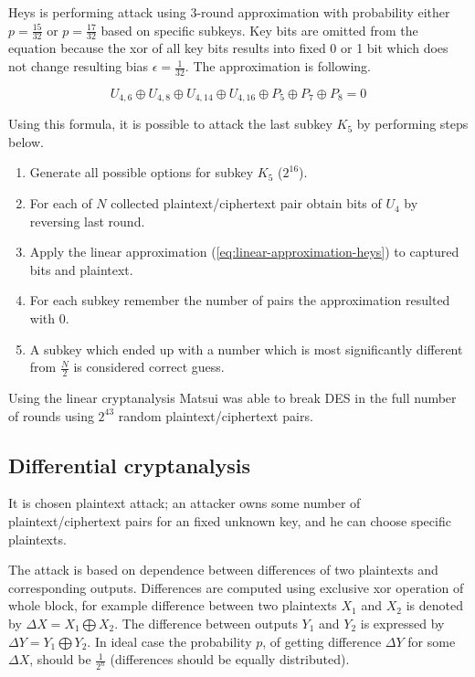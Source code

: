 \documentclass[
    digital,    %
    oneside,    %
    color,
    11pt,
    nocover,
    notable,
    nolof,
    nolot,
    final
]{fithesis3}
\renewcommand\_{\textunderscore\allowbreak}
\begin{document}
\begin{description}
	Heys is performing attack using 3-round approximation with probability either $p = \frac{15}{32}$ or $p = \frac{17}{32}$ based on specific subkeys. Key bits are omitted from the equation because the xor of all key bits results into fixed 0 or 1 bit which does not change resulting bias $\epsilon = \frac{1}{32}$. The approximation is following.   
	
	\begin{equation}
	U_{4,6} \oplus U_{4,8} \oplus U_{4,14} \oplus U_{4,16} \oplus P_{5} \oplus P_{7} \oplus P_{8} = 0
	\label{eq:linear-approximation-heys}
	\end{equation}
	
	Using this formula, it is possible to attack the last subkey $K_5$ by performing steps below.
	
	\begin{enumerate}
		\item Generate all possible options for subkey $K_{5}$ ($2^{16}$).
		\item For each of $N$ collected plaintext/ciphertext pair obtain bits of $U_{4}$ by reversing last round. 
		\item Apply the linear approximation (\cref{eq:linear-approximation-heys}) to captured bits and plaintext.
		\item For each subkey remember the number of pairs the approximation resulted with 0.  
		\item A subkey which ended up with a number which is most significantly different from $\frac{N}{2}$ is considered correct guess.
	\end{enumerate}
\end{description}

Using the linear cryptanalysis Matsui \cite{matsuiAttack} was able to break DES in the full number of rounds using $2^{43}$ random plaintext/ciphertext pairs.

\subsection{Differential cryptanalysis}

It is chosen plaintext attack; an attacker owns some number of plaintext/ciphertext pairs for an fixed unknown key, and he can choose specific plaintexts. 

The attack is based on dependence between differences of two plaintexts and corresponding outputs. Differences are computed using exclusive xor operation of whole block, for example difference between two plaintexts $X_{1}$ and $X_{2}$ is denoted by $\Delta X = X_{1} \bigoplus X_{2}$. The difference between outputs $Y_{1}$ and $Y_{2}$ is expressed by $\Delta Y = Y_{1} \bigoplus Y_{2}$. In ideal case the probability $p$, of getting difference $\Delta Y$ for some  $\Delta X$, should be $\frac{1}{2^{n}}$ (differences should be equally distributed). 
\end{document}
